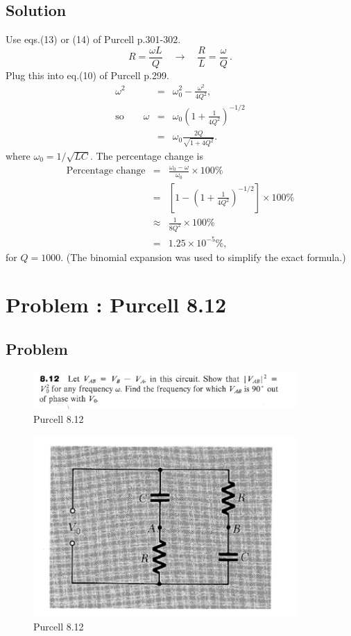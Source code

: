 \documentclass[solutions]{esg8022pset}
\begin{document}
\subsection{Solution}
Use eqs.(13) or (14) of Purcell p.301-302.
\begin{equation}
R=\frac{\omega L}{Q} \quad\to\quad \frac{R}{L}=\frac{\omega}{Q}\,.
\end{equation}
Plug this into eq.(10) of Purcell p.299.
\begin{eqnarray}
\omega^2 &=& \omega_0^2-\frac{\omega^2}{4Q^2},\\
\textrm{so} \qquad \omega &=& \omega_0 \left(1+\frac{1}{4Q^2}\right)^{-1/2}\\
&=& \omega_0\frac{2Q}{\sqrt{1+4Q^2}}.
\end{eqnarray}
where $\omega_0=1/\sqrt{LC}$.  The percentage change is
\begin{eqnarray}
\textrm{Percentage change} &=& \frac{\omega_0-\omega}{\omega_0}\times
100\%\nonumber\\
&=& \left[1-\left(1+\frac{1}{4Q^2}\right)^{-1/2}\right]\times 100\%\nonumber\\
&\approx & \frac{1}{8Q^2}\times 100\%\nonumber\\
&=& 1.25\times 10^{-5} \%,
\end{eqnarray}
for $Q=1000$.  (The binomial expansion was used to simplify the exact formula.)

\section{Problem \thesection: Purcell 8.12}
\subsection{Problem}

\begin{figure}[H]
    \centering
    \includegraphics[width = 10cm]{pu812}
    \caption{Purcell 8.12}
  \end{figure}

  \begin{figure}[H]
    \centering
    \includegraphics[width = 10cm]{figpu812}
    \caption{Purcell 8.12}
  \end{figure}
\end{document}
